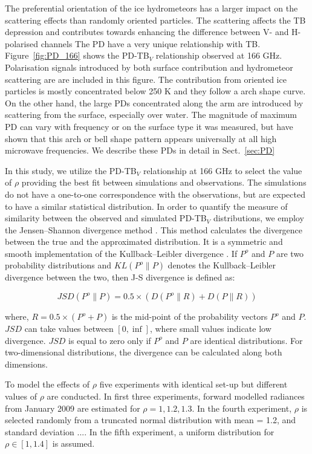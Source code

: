 \documentclass[amt, manuscript]{copernicus}
\begin{document}
The preferential orientation of the ice hydrometeors has a larger impact on the scattering effects than randomly oriented particles. The scattering affects the TB depression and contributes towards enhancing the difference between V- and H- polarised channels \citep{xie:polar:11}
The PD have a very unique relationship with TB. Figure~\ref{fig:PD_166} shows the PD-TB$_V$ relationship observed at 166\,\,GHz. Polarisation signals introduced by both surface contribution and hydrometeor scattering are are included in this figure. The contribution from oriented ice particles is mostly concentrated below 250\,\,K and they follow a arch shape curve. On the other hand, the large PDs concentrated along the arm are introduced by scattering from the surface, especially over water. The magnitude of maximum PD can vary with frequency or on the surface type it was measured, but \citet{gong:micro:17} have shown that this arch or bell shape pattern appears universally at all high microwave frequencies. We describe these PDs in detail in Sect.~\ref{sec:PD} 

In this study, we utilize the PD-TB$_V$ relationship at 166\,\,GHz to select the value of $\rho$ providing the best fit between simulations and observations. The simulations do not have a one-to-one correspondence with the observations, but are expected to have a similar statistical distribution. In order to quantify the measure of similarity between the observed and simulated PD-TB$_V$ distributions, we employ the Jensen–Shannon divergence method \citep{}. This method calculates the divergence between the true and the approximated distribution. It is a symmetric and smooth implementation of the Kullback–Leibler divergence \citep{}. If $P^o$ and $P$ are two probability distributions and $KL (P^o \parallel P)$ denotes the Kullback–Leibler divergence between the two, then J-S divergence is defined as:

\begin{equation}
JSD(P^o \parallel P) = 0.5 \times (D(P^o \parallel R)+D(P \parallel R))
\end{equation}

where, $R = 0.5 \times (P^o + P)$ is the mid-point of the probability vectors $P^o$ and $P$. $JSD$ can take values between $[0, \inf]$, where small values indicate low divergence. $JSD$ is equal to zero only if $P^o$ and $P$ are identical distributions. For two-dimensional distributions, the divergence can be calculated along both dimensions.   


To model the effects of $\rho$ five experiments with identical set-up but different values of $\rho$ are conducted. In first three experiments, forward modelled radiances from January 2009 are estimated for $\rho = 1, 1.2, 1.3$. In the fourth experiment, $\rho$ is selected randomly from a truncated normal distribution with mean = 1.2, and standard deviation .... In the fifth experiment, a uniform distribution for $\rho\in[1, 1.4]$ is assumed. 
\end{document}
